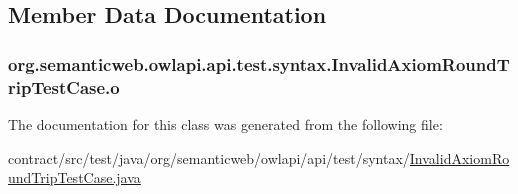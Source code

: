 \subsection{Member Data Documentation}
\hypertarget{classorg_1_1semanticweb_1_1owlapi_1_1api_1_1test_1_1syntax_1_1_invalid_axiom_round_trip_test_case_ab04490ff7ad3820fb26397fa630cfd61}{
\subsubsection[{o}]{ org.\-semanticweb.\-owlapi.\-api.\-test.\-syntax.\-Invalid\-Axiom\-Round\-Trip\-Test\-Case.\-o\hspace{0.3cm}{\ttfamily [private]}}}\label{classorg_1_1semanticweb_1_1owlapi_1_1api_1_1test_1_1syntax_1_1_invalid_axiom_round_trip_test_case_ab04490ff7ad3820fb26397fa630cfd61}


The documentation for this class was generated from the following file\-:\begin{DoxyCompactItemize}
\item 
contract/src/test/java/org/semanticweb/owlapi/api/test/syntax/\hyperlink{_invalid_axiom_round_trip_test_case_8java}{Invalid\-Axiom\-Round\-Trip\-Test\-Case.\-java}\end{DoxyCompactItemize}
